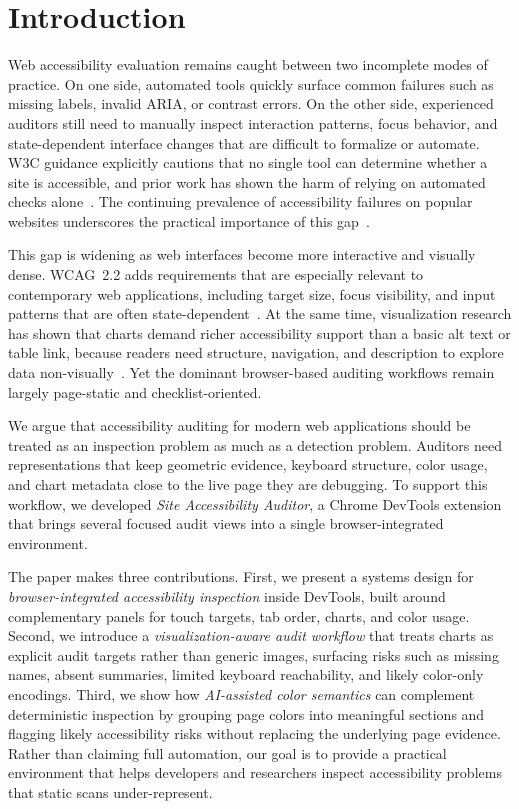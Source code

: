 \section{Introduction}
\label{sec:introduction}

Web accessibility evaluation remains caught between two incomplete modes of practice. On one side, automated tools quickly surface common failures such as missing labels, invalid ARIA, or contrast errors. On the other side, experienced auditors still need to manually inspect interaction patterns, focus behavior, and state-dependent interface changes that are difficult to formalize or automate. W3C guidance explicitly cautions that no single tool can determine whether a site is accessible, and prior work has shown the harm of relying on automated checks alone~\cite{w3cEvalOverview,vigo2013benchmarking}. The continuing prevalence of accessibility failures on popular websites underscores the practical importance of this gap~\cite{webaim2026}.

This gap is widening as web interfaces become more interactive and visually dense. WCAG~2.2 adds requirements that are especially relevant to contemporary web applications, including target size, focus visibility, and input patterns that are often state-dependent~\cite{wcag22rec,wcag22new}. At the same time, visualization research has shown that charts demand richer accessibility support than a basic alt text or table link, because readers need structure, navigation, and description to explore data non-visually~\cite{zong2022rich,blanco2022olli}. Yet the dominant browser-based auditing workflows remain largely page-static and checklist-oriented.

We argue that accessibility auditing for modern web applications should be treated as an inspection problem as much as a detection problem. Auditors need representations that keep geometric evidence, keyboard structure, color usage, and chart metadata close to the live page they are debugging. To support this workflow, we developed \textit{Site Accessibility Auditor}, a Chrome DevTools extension that brings several focused audit views into a single browser-integrated environment.

The paper makes three contributions. First, we present a systems design for \textit{browser-integrated accessibility inspection} inside DevTools, built around complementary panels for touch targets, tab order, charts, and color usage. Second, we introduce a \textit{visualization-aware audit workflow} that treats charts as explicit audit targets rather than generic images, surfacing risks such as missing names, absent summaries, limited keyboard reachability, and likely color-only encodings. Third, we show how \textit{AI-assisted color semantics} can complement deterministic inspection by grouping page colors into meaningful sections and flagging likely accessibility risks without replacing the underlying page evidence. Rather than claiming full automation, our goal is to provide a practical environment that helps developers and researchers inspect accessibility problems that static scans under-represent.

